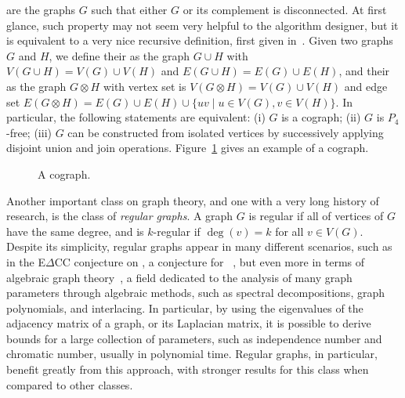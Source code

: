  are the graphs $G$ such that either $G$ or its complement is disconnected. At first glance, such property may not seem very helpful to the algorithm designer, but it is equivalent to a very nice recursive definition, first given in~\citep{cographs}.
Given two graphs $G$ and $H$, we define their  as the graph $G \cup H$ with $V(G \cup H)= V(G) \cup V(H)$ and $E(G \cup H) = E(G) \cup E(H)$, and their  as the graph $G \otimes H$ with vertex set is $V(G \otimes H)= V(G) \cup V(H)$ and edge set $E(G \otimes H)= E(G) \cup E(H) \cup \{uv \mid u \in V(G), v \in V(H)\}$.
In particular, the following statements are equivalent: (i) $G$ is a cograph; (ii) $G$ is $P_4$-free; (iii) $G$ can be constructed from isolated vertices by successively applying disjoint union and join operations.
Figure~\ref{fig:some_cograph} gives an example of a cograph.

\begin{figure}[!htb]
    \centering
    \caption{A cograph.}
    \label{fig:some_cograph}
\end{figure}

Another important class on graph theory, and one with a very long history of research, is the class of \textit{regular graphs}.
A graph $G$ is regular if all of vertices of $G$ have the same degree, and is $k$-regular if $\deg(v) = k$ for all $v \in V(G)$.
Despite its simplicity, regular graphs appear in many different scenarios, such as in the E$\Delta$CC conjecture on , a conjecture for ~\citep{internal_partition_regular6}, but even more in terms of algebraic graph theory~\citep{godsil}, a field dedicated to the analysis of many graph parameters through algebraic methods, such as spectral decompositions, graph polynomials, and interlacing.
In particular, by using the eigenvalues of the adjacency matrix of a graph, or its Laplacian matrix, it is possible to derive bounds for a large collection of parameters, such as independence number and chromatic number, usually in polynomial time.
Regular graphs, in particular, benefit greatly from this approach, with stronger results for this class when compared to other classes.


